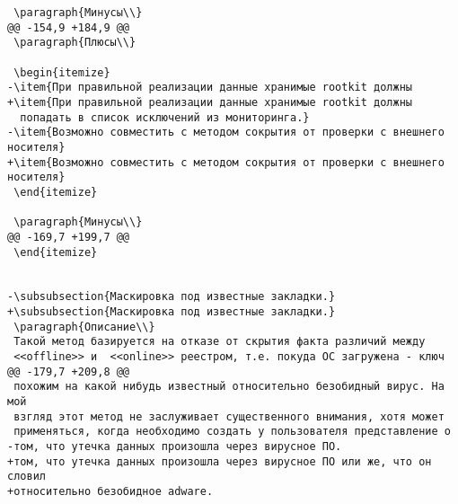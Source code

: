 \begin{verbatim}
 \paragraph{Минусы\\}
@@ -154,9 +184,9 @@
 \paragraph{Плюсы\\}

 \begin{itemize}
-\item{При правильной реализации данные хранимые rootkit должны
+\item{При правильной реализации данные хранимые rootkit должны
  попадать в список исключений из мониторинга.}
-\item{Возможно совместить с методом сокрытия от проверки с внешнего носителя}
+\item{Возможно совместить с методом сокрытия от проверки с внешнего носителя}
 \end{itemize}

 \paragraph{Минусы\\}
@@ -169,7 +199,7 @@
 \end{itemize}


-\subsubsection{Маскировка под известные закладки.}
+\subsubsection{Маскировка под известные закладки.}
 \paragraph{Описание\\}
 Такой метод базируется на отказе от скрытия факта различий между
 <<offline>> и  <<online>> реестром, т.е. покуда ОС загружена - ключ
@@ -179,7 +209,8 @@
 похожим на какой нибудь известный относительно безобидный вирус. На мой
 взгляд этот метод не заслуживает существенного внимания, хотя может
 применяться, когда необходимо создать у пользователя представление о
-том, что утечка данных произошла через вирусное ПО.
+том, что утечка данных произошла через вирусное ПО или же, что он словил
+относительно безобидное adware.


\end{verbatim}

